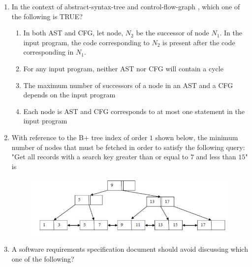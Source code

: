 \documentclass[journal,12pt,onecolumn]{IEEEtran}
\theoremstyle{remark}
\begin{document}
\begin{enumerate}
		\item In the context of abstract-syntax-tree  and control-flow-graph , which one of the following is TRUE?
		
		\hfill{}
		
		\begin{enumerate}
			\item In both AST and CFG, let node, $N_2$ be the successor of node $N_1$. In the input program, the code corresponding to $N_2$ is present after the code corresponding in $N_1$.
			\item For any input program, neither AST nor CFG will contain a cycle
			\item The maximum number of successors of a node in an AST and a CFG depends on the input program
			\item Each node is AST and CFG corresponds to at most one statement in the input program
		\end{enumerate}
		
		\item With reference to the B+ tree index of order $1$ shown below, the minimum number of nodes  that must be fetched in order to satisfy the following query: "Get all records with a search key greater than or equal to $7$ and less than $15$" is \underline{\hspace{2cm}}
		
\begin{figure}[H]
	\centering
	\includegraphics[width=0.7\linewidth]{figs/screenshot002}
	\caption{}
	\label{fig:screenshot002}
\end{figure}

		
		\hfill{}
		
		\item A software requirements specification  document should avoid discussing which one of the following?
		
		\hfill{}
		
		\begin{enumerate}
		\end{enumerate}
		

\end{enumerate}
\end{document}
